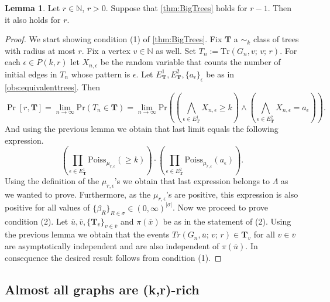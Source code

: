 \documentclass[12pt,notitlepage,a4paper]{article}
\theoremstyle{definition}
\newtheorem{lemma}{Lemma}[section]
\newcommand{\N}{\mathbb{N}}
\newcommand{\Ln}{\lim\limits_{n\to \infty}}
\newcommand{\Tr}{\mathrm{Tr}}
\newcommand{\sep}{\noindent\rule{2cm}{0.4pt}}
\begin{document}
\begin{lemma} \label{lem:singletreeprob}
Let $r\in \N$, $r>0$. Suppose that \cref{thm:BigTrees}
holds for $r-1$. Then it also holds for $r$. 
\end{lemma}
\begin{proof}
We start showing condition (1) of \cref{thm:BigTrees}.
Fix $\mathbf{T}$ a $\sim_k$ class of trees with radius at most $r$. 
Fix a vertex $v\in \N$ as well. Set $T_n:=\Tr(G_n,v;\,v;\,r)$.
For each $\epsilon\in P(k,r)$ let
$X_{n,\epsilon}$ be the random 
variable that counts the number
of initial edges in $T_n$ whose pattern is 
$\epsilon$. Let $E^1_\mathbf{T}, E^2_\mathbf{T}, 
\{a_\epsilon\}_\epsilon$ be as in \cref{obs:equivalenttrees}.
Then
\[
\Pr[r,\mathbf{T}]=
\Ln 
\mathrm{Pr}(T_n\in \mathbf{T})
=
\Ln
\mathrm{Pr}\left(
\left(
\bigwedge_{\epsilon\in E^1_\mathbf{T}}
X_{n,\epsilon}\geq k
\right) \wedge
\left(
\bigwedge_{\epsilon\in E^2_\mathbf{T}}
X_{n,\epsilon}= a_\epsilon
\right)
\right).
\]
And using the previous lemma we obtain that last limit
equals the following expression.
\[ 
\left(
\prod_{\epsilon\in E^1_\mathbf{T}}
\mathrm{Poiss}_{\mu_{r,\epsilon}}(\geq k ) 
\right)\cdot
\left(
\prod_{\epsilon\in E^2_\mathbf{T}}
\mathrm{Poiss}_{\mu_{r,\epsilon}}(a_\epsilon) 
\right).
\]
Using the definition of 
the $\mu_{r,\epsilon}$'s we obtain that last expression
belongs to $\Lambda$ as we wanted to prove. Furthermore,
as the $\mu_{r,\epsilon}$'s are positive, this expression is also 
positive for all values of
$\{\beta_R\}_{R\in \sigma}\in (0,\infty)^{|\sigma|}$.
Now we proceed to prove condition (2). 
Let $\overline{u},\overline{v}, \{\mathbf{T}_v\}_{v\in \overline{v}}$
and $\pi(\overline{x})$ be as in the statement of (2). 
Using the previous lemma we obtain that the events
$Tr(G_n,\overline{u};\, v;\, r)\in \mathbf{T}_v$ for all $v\in \overline{v}$
are asymptotically independent and are also independent of $\pi(\overline{u})$. 
In consequence the desired result follows from condition (1). 
\end{proof}

\subsection{Almost all graphs are (k,r)-rich}
\end{document}
